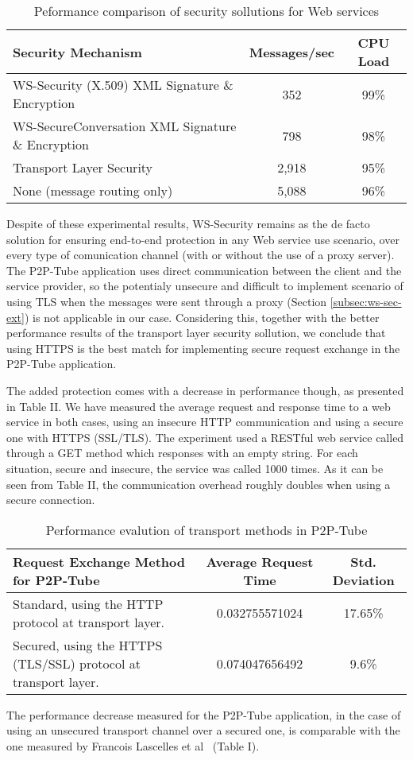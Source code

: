 \begin{table}
\label{table:ws-sec-perf}
\caption{Peformance comparison of security sollutions for Web services}
\centering
    \begin{tabular}{|p{4cm}|c|c|}
        \hline
        \textbf{Security Mechanism}      & \textbf{Messages/sec} & \textbf{CPU Load} \\ \hline
        WS-Security (X.509) XML Signature  \&  Encryption & 352                 & 99\%       \\ \hline
        WS-SecureConversation XML Signature  \&  Encryption & 798                 & 98\%     \\ \hline
        Transport Layer Security                         & 2,918               & 95\%       \\ \hline
        None (message routing only)                      & 5,088               & 96\%       \\
        \hline
    \end{tabular}
\end{table}

Despite of these experimental results, WS-Security remains as the de facto solution for ensuring end-to-end protection in any Web service use scenario, over every type of comunication channel (with or without the use of a proxy server). The P2P-Tube application uses direct communication between the client and the service provider, so the potentialy unsecure and difficult to implement scenario of using TLS when the messages were sent through a proxy (Section \ref{subsec:ws-sec-ext}) is not applicable in our case.
Considering this, together with the better performance results of the transport layer security sollution, we conclude that using HTTPS is the best match for implementing secure request exchange in the P2P-Tube application.

The added protection comes with a decrease in performance though, as presented in Table II. We have measured the average request and response time to a web service in both cases, using an insecure HTTP communication and using a secure one with HTTPS (SSL/TLS). The experiment used a RESTful web service called through a GET method which responses with an empty string. For each situation, secure and insecure, the service was called 1000 times. As it can be seen from Table II, the communication overhead roughly doubles when using a secure connection. 

\begin{table}
\label{table:ws-sec-perf-p2p}
\caption{Performance evalution of transport methods in P2P-Tube}
\centering
    \begin{tabular}{|p{3cm}|c|c|}
        \hline 
        \textbf{Request Exchange Method for P2P-Tube} & \textbf{Average Request Time} & \textbf{Std. Deviation} \\ \hline
        Standard, using the HTTP protocol at transport layer. & 0.032755571024 & 17.65\% \\ \hline
        Secured, using the HTTPS (TLS/SSL) protocol at transport layer. & 0.074047656492 & 9.6\% \\
        \hline
    \end{tabular}
\end{table}

The performance decrease measured for the P2P-Tube application, in the case of using an unsecured transport channel over a secured one, is comparable with the one measured by Francois Lascelles et al~\cite{ws-sec-perf} (Table I).
